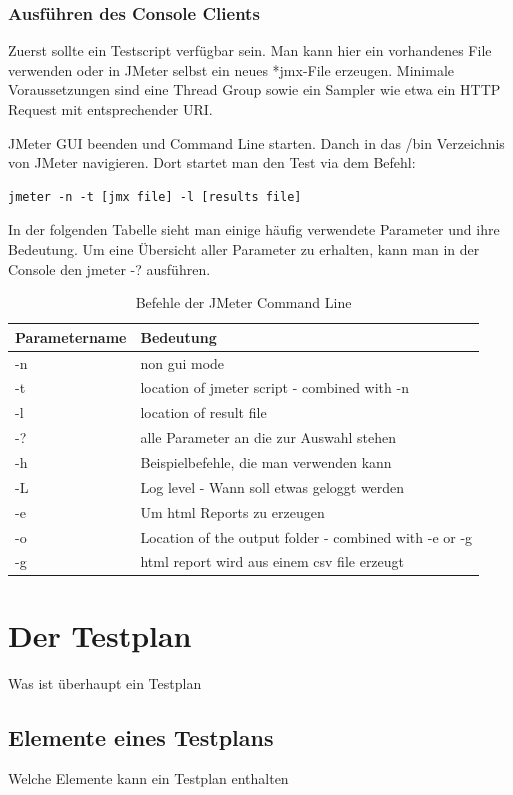\documentclass[a4paper,12pt]{article}
\begin{document}
\subsubsection{Ausführen des Console Clients}
Zuerst sollte ein Testscript verfügbar sein. Man kann hier ein vorhandenes File verwenden oder in JMeter selbst ein neues *jmx-File erzeugen. Minimale Voraussetzungen sind eine Thread Group sowie ein Sampler wie etwa ein HTTP Request mit entsprechender URI.

JMeter GUI beenden und Command Line starten. Danch in das /bin Verzeichnis von JMeter navigieren. Dort startet man den Test via dem Befehl:
\begin{lstlisting}[style=Cpp]
  jmeter -n -t [jmx file] -l [results file]
\end{lstlisting}
In der folgenden Tabelle sieht man einige häufig verwendete Parameter und ihre Bedeutung. Um eine Übersicht aller Parameter zu erhalten, kann man in der Console den jmeter -? ausführen.
\begin{table}[H]
	\centering
	\begin{tabular}{|l|l|}
		\hline
		\textbf{Parametername} & \textbf{Bedeutung} \\
		\hline
		-n & non gui mode \\
		-t & location of jmeter script - combined with -n \\
		-l & location of result file \\
		-? & alle Parameter an die zur Auswahl stehen \\
		-h & Beispielbefehle, die man verwenden kann \\
		-L & Log level - Wann soll etwas geloggt werden \\
		-e & Um html Reports zu erzeugen\\
		-o & Location of the output folder - combined with -e or -g \\
		-g & html report wird aus einem csv file erzeugt \\ 
		\hline
	\end{tabular}
	\caption[tab_parameter_non_gui]{Befehle der JMeter Command Line}
	\label{tab_parameter_non_gui}
\end{table}





\section{Der Testplan}
Was ist überhaupt ein Testplan
\subsection{Elemente eines Testplans}
Welche Elemente kann ein Testplan enthalten
\end{document}
